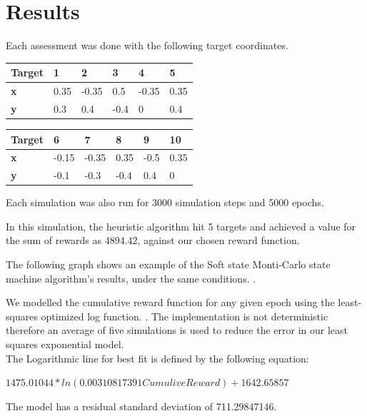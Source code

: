 \section{Results}


Each assessment was done with the following target coordinates.

\begingroup
{\centering
    \begin{tabular}{|l|l|l|l|l|l|}
    \hline
    \textbf{Target} & \textbf{1} & \textbf{2} & \textbf{3} & \textbf{4} & \textbf{5}  \\ \hline
    \textbf{x}      & 0.35       & -0.35      & 0.5        & -0.35      & 0.35        \\ \hline
    \textbf{y}      & 0.3        & 0.4        & -0.4       & 0          & 0.4         \\ \hline
    \end{tabular}
    \begin{tabular}{|l|l|l|l|l|l|}
        \hline
        \textbf{Target} & \textbf{6} & \textbf{7} & \textbf{8} & \textbf{9} & \textbf{10} \\ \hline
        \textbf{x}      & -0.15      & -0.35      & 0.35       & -0.5       & 0.35        \\ \hline
        \textbf{y}      & -0.1       & -0.3       & -0.4       & 0.4        & 0           \\ \hline
        \end{tabular}
}
\endgroup


Each simulation was also run for 3000 simulation steps and 5000 epochs.

In this simulation, the heuristic algorithm hit 5 targets and achieved a value for the sum of rewards as 4894.42, against our chosen reward function.

The following graph shows an example of the Soft state Monti-Carlo state machine algorithm’s results, under the same conditions. .

We modelled the cumulative reward function for any given epoch using the least-squares optimized log function. . The implementation is not deterministic therefore an average of five simulations is used to reduce the error in our least squares exponential model.
\\
The Logarithmic line for best fit is defined by the following equation:

\begingroup\centering
$1475.01044*ln(0.00310817391CumuliveReward) + 1642.65857$
\endgroup

The model has a residual standard deviation of 711.29847146. 

